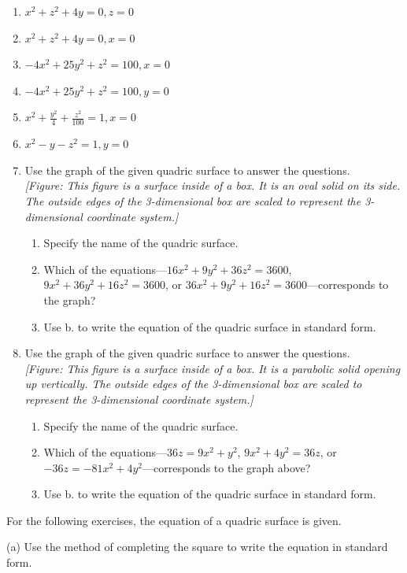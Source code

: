 \documentclass{exercises}
\begin{document}
\begin{enumerate}[resume]
\item \techrequired $x^{2}+z^{2}+4y=0,z=0$
\item \techrequired $x^{2}+z^{2}+4y=0,x=0$
\item \techrequired $-4x^{2}+25y^{2}+z^{2}=100,x=0$
\item \techrequired $-4x^{2}+25y^{2}+z^{2}=100,y=0$
\item \techrequired $x^{2}+\frac{y^{2}}{4}+\frac{z^{2}}{100}=1,x=0$
\item \techrequired $x^{2}-y-z^{2}=1,y=0$
\item Use the graph of the given quadric surface to answer the questions. \\ \textit{[Figure: This figure is a surface inside of a box. It is an oval solid on its side. The outside edges of the 3-dimensional box are scaled to represent the 3-dimensional coordinate system.]}
\begin{enumerate}[label=(\alph*)]
  \item Specify the name of the quadric surface.
  \item Which of the equations---$16x^{2}+9y^{2}+36z^{2}=3600$, $9x^{2}+36y^{2}+16z^{2}=3600$, or $36x^{2}+9y^{2}+16z^{2}=3600$---corresponds to the graph?
  \item Use b. to write the equation of the quadric surface in standard form.
\end{enumerate}
\item Use the graph of the given quadric surface to answer the questions. \\ \textit{[Figure: This figure is a surface inside of a box. It is a parabolic solid opening up vertically. The outside edges of the 3-dimensional box are scaled to represent the 3-dimensional coordinate system.]}
\begin{enumerate}[label=(\alph*)]
  \item Specify the name of the quadric surface.
  \item Which of the equations---$36z=9x^{2}+y^{2}$, $9x^{2}+4y^{2}=36z$, or $-36z=-81x^{2}+4y^{2}$---corresponds to the graph above?
  \item Use b. to write the equation of the quadric surface in standard form.
\end{enumerate}
\end{enumerate}

For the following exercises, the equation of a quadric surface is given.


(a) Use the method of completing the square to write the equation in standard form.
\end{document}
